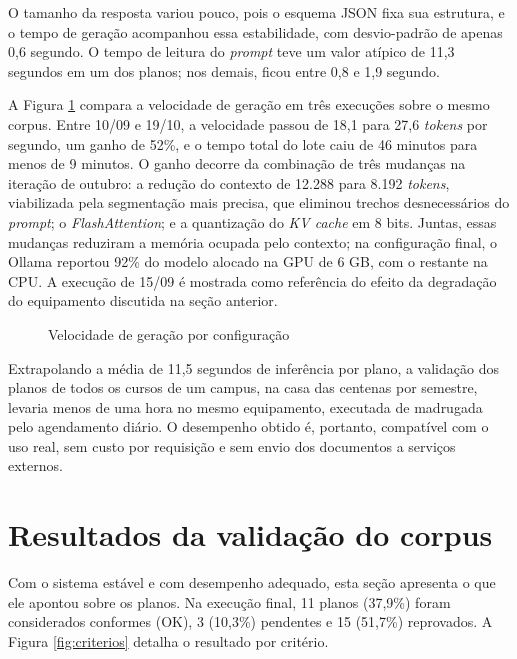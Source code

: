 O tamanho da resposta variou pouco, pois o esquema JSON fixa sua estrutura, e o tempo de geração acompanhou essa estabilidade, com desvio-padrão de apenas 0,6 segundo. O tempo de leitura do \textit{prompt} teve um valor atípico de 11,3 segundos em um dos planos; nos demais, ficou entre 0,8 e 1,9 segundo.

A Figura \ref{fig:desempenho} compara a velocidade de geração em três execuções sobre o mesmo corpus. Entre 10/09 e 19/10, a velocidade passou de 18,1 para 27,6 \textit{tokens} por segundo, um ganho de 52\%, e o tempo total do lote caiu de 46 minutos para menos de 9 minutos. O ganho decorre da combinação de três mudanças na iteração de outubro: a redução do contexto de 12.288 para 8.192 \textit{tokens}, viabilizada pela segmentação mais precisa, que eliminou trechos desnecessários do \textit{prompt}; o \textit{FlashAttention}; e a quantização do \textit{KV cache} em 8 bits. Juntas, essas mudanças reduziram a memória ocupada pelo contexto; na configuração final, o Ollama reportou 92\% do modelo alocado na GPU de 6 GB, com o restante na CPU. A execução de 15/09 é mostrada como referência do efeito da degradação do equipamento discutida na seção anterior.

\begin{figure}[htbp]
\centering
\caption{Velocidade de geração por configuração}
\label{fig:desempenho}

\end{figure}

Extrapolando a média de 11,5 segundos de inferência por plano, a validação dos planos de todos os cursos de um campus, na casa das centenas por semestre, levaria menos de uma hora no mesmo equipamento, executada de madrugada pelo agendamento diário. O desempenho obtido é, portanto, compatível com o uso real, sem custo por requisição e sem envio dos documentos a serviços externos.

\section{Resultados da validação do corpus}
\label{sec:res-corpus}

Com o sistema estável e com desempenho adequado, esta seção apresenta o que ele apontou sobre os planos. Na execução final, 11 planos (37,9\%) foram considerados conformes (OK), 3 (10,3\%) pendentes e 15 (51,7\%) reprovados. A Figura \ref{fig:criterios} detalha o resultado por critério.

